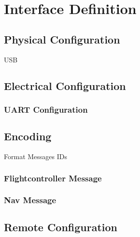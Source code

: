 \chapter{Interface Definition}
\section{Physical Configuration}
USB

\section{Electrical Configuration}
\subsection{UART Configuration}

\section{Encoding}
Format
Messages
IDs

\subsection{Flightcontroller Message}

\subsection{Nav Message}

\section{Remote Configuration}


